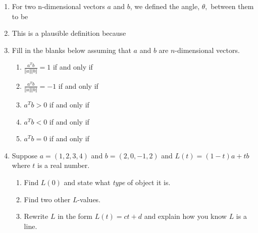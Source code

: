 \documentclass[11pt,fleqn]{article}
\begin{document}
\renewcommand{\headrulewidth}{0pt}
\newcommand{\blank}[1]{\rule{#1}{0.75pt}}
\renewcommand{\d}{\displaystyle}
\vspace*{-0.7in}
\begin{center}
  \large {}
\end{center}
\begin{enumerate}
\item  For two n-dimensional vectors $a$ and $b$, we defined the angle, $\theta,$ between them to be

\vfill

\item This is a plausible definition because \\

\vfill

\item Fill in the blanks below assuming that $a$ and $b$ are $n$-dimensional vectors.
	\begin{enumerate}
	\item $\frac{a^Tb}{\Vert a \Vert \Vert b \Vert}=1$ if and only if\\
	
	\item $\frac{a^Tb}{\Vert a \Vert \Vert b \Vert}=-1$ if and only if\\
	
	\item ${a^Tb}>0$ if and only if\\
	
	\item ${a^Tb}<0$ if and only if\\
	
	\item  $a^Tb=0$ if and only if\\
	
	\end{enumerate}
	
\item Suppose $a=(1,2,3,4)$ and $b=(2,0,-1,2)$ and $L(t)=(1-t)a+tb$ where $t$ is a real number.
	\begin{enumerate}
	\item Find $L(0)$ and state what \emph{type} of object it is.
	
	\vfill
	\item Find two other $L$-values.
	
	\vfill
	\item Rewrite $L$ in the form $L(t)=ct+d$ and explain how you know $L$ is a line.
	\vfill
	\end{enumerate}
	
	

\end{enumerate}
\end{document}
